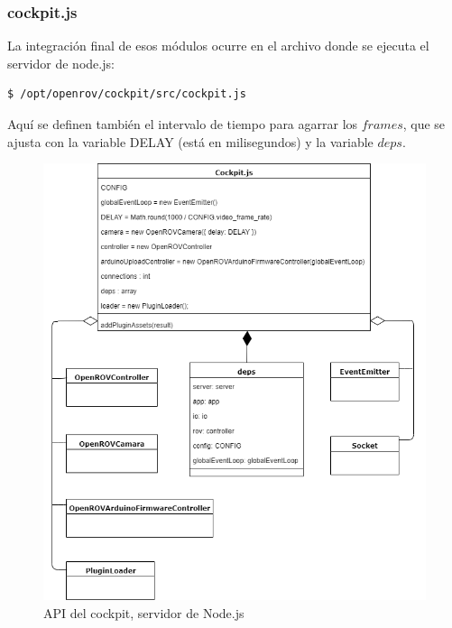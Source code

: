 \subsubsection{cockpit.js}

\par La integración final de esos módulos ocurre en el archivo donde se ejecuta el servidor de node.js:

\begin{verbatim}
$ /opt/openrov/cockpit/src/cockpit.js    
\end{verbatim} 

\par Aquí se definen también el intervalo de tiempo para agarrar los $frames$, que se ajusta con la variable DELAY (está en milisegundos) y la variable $deps$.

\begin{figure}[H]
    \centering
    \includegraphics[scale=0.60]{partes/ImgSophia/ApendiceC/ApiCockpitjs4.png}
    \caption{API del cockpit, servidor de Node.js}
    \label{fig:Apicockpit4}
\end{figure}

